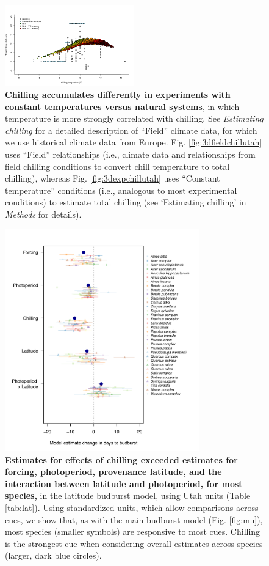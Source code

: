 \documentclass{article}
\begin{document}
\begin{figure}[h!]
\centering
\noindent \includegraphics[width=0.50\textwidth]{..//..//analyses/bb_analysis/figures/EDFig4_exp_vs_field_chill_withwarmingcols.png}
\caption{\textbf{Chilling accumulates differently in experiments with constant temperatures versus natural systems}, in which temperature is more strongly correlated with chilling. See \emph{Estimating chilling} for a detailed description of ``Field'' climate data, for which we use historical climate data from Europe. Fig. \ref{fig:3dfieldchillutah} uses ``Field'' relationships (i.e., climate data and relationships from field chilling conditions to convert chill temperature to total chilling), whereas Fig. \ref{fig:3dexpchillutah} uses ``Constant temperature'' conditions (i.e., analogous to most experimental conditions) to estimate total chilling (see `Estimating chilling' in \emph{Methods} for details).}
\label{fig:chillexpfield}
\end{figure}

\begin{figure}[h!]
\centering
\noindent \includegraphics[width=0.75\textwidth]{..//..//analyses/lat_analysis/figures/EDFig5_latanalysis_spcom_expramp_fp.pdf}
\caption{\textbf{Estimates for effects of chilling exceeded estimates for forcing, photoperiod, provenance latitude, and the interaction between latitude and photoperiod, for most species,} in the latitude budburst model, using Utah units (Table \ref{tab:lat}). Using standardized units, which allow comparisons across cues, we show that, as with the main budburst model (Fig. \ref{fig:mu}), most species (smaller symbols) are responsive to most cues. Chilling is the strongest cue when considering overall estimates across species (larger, dark blue circles).}
\label{fig:lat}
\end{figure}
\end{document}
